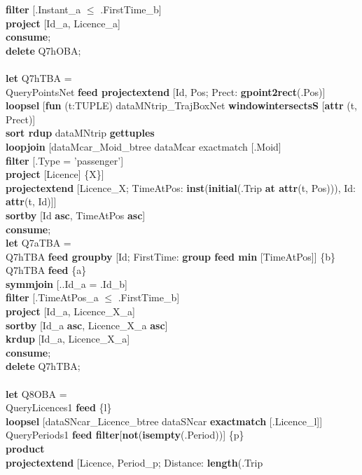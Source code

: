 \documentclass[a4paper]{article}
\newcommand{\op}[1]{\textbf{#1}}
\begin{document}
\begin{scriptsize}
\begin{tabbing}
\>\op{filter} [.Instant\_a $\leq$ .FirstTime\_b]\\
\>\op{project} [Id\_a, Licence\_a]\\
\op{consume};\\
\op{delete} Q7hOBA;\\
\\
\op{let} Q7hTBA =\\
\>QueryPointsNet \op{feed projectextend} [Id, Pos; Prect: \op{gpoint2rect}(.Pos)]\\
\>\op{loopsel} [\op{fun} (t:TUPLE) dataMNtrip\_TrajBoxNet \op{windowintersectsS} [\op{attr} (t, Prect)]\\
\>\>\op{sort rdup} dataMNtrip \op{gettuples}\\
\>\>\op{loopjoin} [dataMcar\_Moid\_btree dataMcar exactmatch [.Moid]\\
\>\>\>\op{filter} [.Type = 'passenger']\\
\>\>\>\op{project} [Licence] \{X\}]\\
\>\>\op{projectextend} [Licence\_X; TimeAtPos: \op{inst}(\op{initial}(.Trip \op{at attr}(t, Pos))), Id: \op{attr}(t, Id)]]\\
\>\op{sortby} [Id \op{asc}, TimeAtPos \op{asc}]\\
\op{consume};\\
\op{let} Q7aTBA =\\
\>Q7hTBA \op{feed groupby} [Id; FirstTime: \op{group feed min} [TimeAtPos]] \{b\}\\
\>Q7hTBA \op{feed} \{a\}\\
\>\op{symmjoin} [..Id\_a = .Id\_b]\\
\>\op{filter} [.TimeAtPos\_a $\leq$ .FirstTime\_b]\\
\>\op{project} [Id\_a, Licence\_X\_a]\\
\>\op{sortby} [Id\_a \op{asc}, Licence\_X\_a \op{asc}]\\
\>\op{krdup} [Id\_a, Licence\_X\_a]\\
\op{consume};\\
\op{delete} Q7hTBA;\\
\\
\op{let} Q8OBA =\\
\>QueryLicences1 \op{feed} \{l\}\\
\>\>\op{loopsel} [dataSNcar\_Licence\_btree dataSNcar \op{exactmatch}
[.Licence\_l]]\\
\>QueryPeriods1 \op{feed filter}[\op{not}(\op{isempty}(.Period))] \{p\}\\
\>\op{product}\\
\>\op{projectextend} [Licence, Period\_p; Distance: \op{length}(.Trip

\end{tabbing}
\end{scriptsize}
\end{document}

